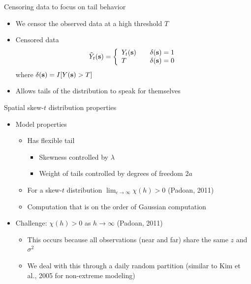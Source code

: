 \documentclass{beamer}
\begin{document}
\begin{frame}{Censoring data to focus on tail behavior}
  \begin{itemize} \setlength{\itemsep}{0.5em}
    \item We censor the observed data at a high threshold $T$
    \item Censored data
    \begin{align*}
      \tilde{Y}_t(\mbox{\bf s}) = \left\{ \begin{array}{ll}
          Y_t(\mbox{\bf s}) \quad & \delta(\mbox{\bf s}) = 1\\
          T \quad & \delta(\mbox{\bf s}) = 0
      \end{array}\right.
    \end{align*}
    where $\delta(\mbox{\bf s}) = I[Y(\mbox{\bf s}) > T]$
    \item Allows tails of the distribution to speak for themselves
  \end{itemize}
\end{frame}

\begin{frame}{Spatial skew-$t$ distribution properties}
  \begin{itemize} \setlength{\itemsep}{0.5em}
      \item Model properties
    \begin{itemize}
    	\item Has flexible tail
      \begin{itemize}
        \item Skewness controlled by $\lambda$
        \item Weight of tails controlled by degrees of freedom $2a$
      \end{itemize}
    	\item For a skew-$t$ distribution $\lim_{c \rightarrow \infty} \chi(h) > 0$ (Padoan, 2011)
    	\item Computation that is on the order of Gaussian computation
    \end{itemize}
    \item Challenge: $\chi(h) > 0$ as $h \rightarrow \infty$ (Padoan, 2011)
    \begin{itemize}
      \item This occurs because all observations (near and far) share the same $z$ and $\sigma^2$
      \item We deal with this through a daily random partition (similar to Kim et al., 2005 for non-extreme modeling)
    \end{itemize}
  \end{itemize}
\end{frame}
\end{document}
